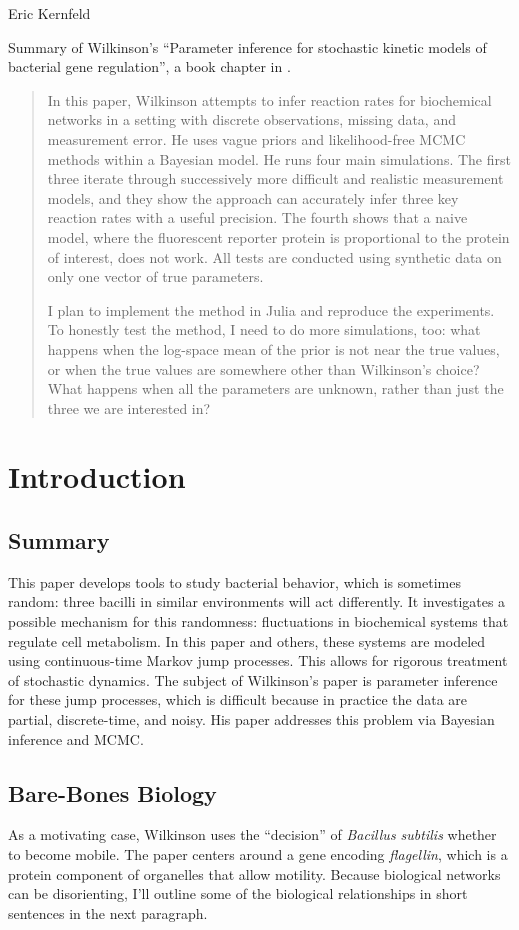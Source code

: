 \documentclass{article}
\begin{document}
Eric Kernfeld

Summary of Wilkinson's ``Parameter inference for stochastic kinetic models of bacterial gene regulation'', a book chapter in \cite{Bernardo2012}.

\begin{abstract}
In this paper, Wilkinson attempts to infer reaction rates for biochemical networks in a setting with discrete observations, missing data, and measurement error. He uses vague priors and likelihood-free MCMC methods within a Bayesian model. He runs four main simulations. The first three iterate through successively more difficult and realistic measurement models, and they show the approach can accurately infer three key reaction rates with a useful precision. The fourth shows that a naive model, where the fluorescent reporter protein is proportional to the protein of interest, does not work. All tests are conducted using synthetic data on only one vector of true parameters.

I plan to implement the method in Julia and reproduce the experiments. To honestly test the method, I need to do more simulations, too: what happens when the log-space mean of the prior is not near the true values, or when the true values are somewhere other than Wilkinson's choice? What happens when all the parameters are unknown, rather than just the three we are interested in?
\end{abstract}


\section{Introduction}
\subsection{Summary}
This paper develops tools to study bacterial behavior, which is sometimes random: three bacilli in similar environments will act differently. It investigates a possible mechanism for this randomness: fluctuations in biochemical systems that regulate cell metabolism. In this paper and others, these systems are modeled using continuous-time Markov jump processes. This allows for rigorous treatment of stochastic dynamics. The subject of Wilkinson's paper is parameter inference for these jump processes, which is difficult because in practice the data are partial, discrete-time, and noisy. His paper addresses this problem via Bayesian inference and MCMC.

\subsection{Bare-Bones Biology}
 As a motivating case, Wilkinson uses the ``decision'' of {\it Bacillus subtilis} whether to become mobile. The paper centers around a gene encoding {\it flagellin}, which is a protein component of organelles that allow motility. Because biological networks can be disorienting, I'll outline some of the biological relationships in short sentences in the next paragraph. 
\end{document}
